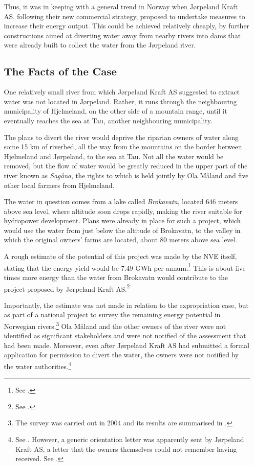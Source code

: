 Thus, it was in keeping with a general trend in Norway when Jørpeland Kraft AS, following their new commercial strategy, proposed to undertake measures to increase their energy output. This could be achieved relatively cheaply, by further constructions aimed at diverting water away from nearby rivers into dams that were already built to collect the water from the Jørpeland river.

\subsection{The Facts of the Case}

One relatively small river from which Jørpeland Kraft AS suggested to extract water was not located in Jørpeland. Rather, it runs through the neighbouring municipality of Hjelmeland, on the other side of a mountain range, until it eventually reaches the sea at Tau, another neighbouring municipality. 

The plans to divert the river would deprive the riparian owners of water along some 15 km of riverbed, all the way from the mountains on the border between Hjelmeland and Jørpeland, to the sea at Tau. Not all the water would be removed, but the flow of water would be greatly reduced in the upper part of the river known as {\it Sagåna}, the rights to which is held jointly by Ola Måland and five other local farmers from Hjelmeland.

The water in question comes from a lake called \emph{Brokavatn}, located 646 meters above sea level, where altitude soon drops rapidly, making the river suitable for hydropower development. Plans were already in place for such a project, which would use the water from just below the altitude of Brokavatn, to the valley in which the original owners' farms are located, about 80 meters above sea level. 

A rough estimate of the potential of this project was made by the NVE itself, stating that the energy yield would be 7.49 GWh per annum.\footnote{See \cite[16]{jorpeland09}.} This is about five times more energy than the water from Brokavatn would contribute to the project proposed by Jørpeland Kraft AS.\footnote{See \cite[19]{jorpeland09}.}

Importantly, the estimate was not made in relation to the expropriation case, but as part of a national project to survey the remaining energy potential in Norwegian rivers.\footnote{The survey was carried out in 2004 and its results are summarised in \cite{jensen04}.} Ola Måland and the other owners of the river were not identified as significant stakeholders and were not notified of the assessment that had been made. Moreover, even after Jørpeland Kraft AS had submitted a formal application for permission to divert the water, the owners were not notified by the water authorities.\footnote{See \cite[16]{jorpeland09}. However, a generic orientation letter was apparently sent by Jørpeland Kraft AS, a letter that the owners themselves could not remember having received. See \cite[5|8]{jorpeland11a}.}

